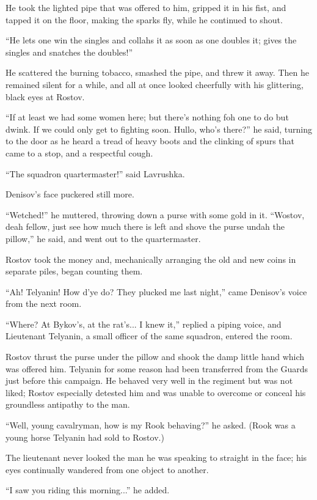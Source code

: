 He took the lighted pipe that was offered to him, gripped it in
his fist, and tapped it on the floor, making the sparks fly,
while he continued to shout.

``He lets one win the singles and collahs it as soon as one
doubles it; gives the singles and snatches the doubles!''

He scattered the burning tobacco, smashed the pipe, and threw it
away.  Then he remained silent for a while, and all at once
looked cheerfully with his glittering, black eyes at Rostov.

``If at least we had some women here; but there's nothing foh one
to do but dwink. If we could only get to fighting soon. Hullo,
who's there?''  he said, turning to the door as he heard a tread
of heavy boots and the clinking of spurs that came to a stop, and
a respectful cough.

``The squadron quartermaster!'' said Lavrushka.

Denisov's face puckered still more.

``Wetched!'' he muttered, throwing down a purse with some gold in
it.  ``Wostov, deah fellow, just see how much there is left and
shove the purse undah the pillow,'' he said, and went out to the
quartermaster.

Rostov took the money and, mechanically arranging the old and new
coins in separate piles, began counting them.

``Ah! Telyanin! How d'ye do? They plucked me last night,'' came
Denisov's voice from the next room.

``Where? At Bykov's, at the rat's... I knew it,'' replied a
piping voice, and Lieutenant Telyanin, a small officer of the
same squadron, entered the room.

Rostov thrust the purse under the pillow and shook the damp
little hand which was offered him. Telyanin for some reason had
been transferred from the Guards just before this campaign. He
behaved very well in the regiment but was not liked; Rostov
especially detested him and was unable to overcome or conceal his
groundless antipathy to the man.

``Well, young cavalryman, how is my Rook behaving?'' he
asked. (Rook was a young horse Telyanin had sold to Rostov.)

The lieutenant never looked the man he was speaking to straight
in the face; his eyes continually wandered from one object to
another.

``I saw you riding this morning...'' he added.

